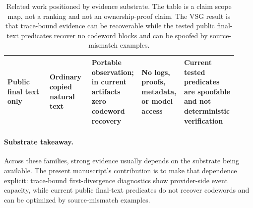 \begin{table}[t]
\begin{tabular}{p{0.18\linewidth}p{0.18\linewidth}p{0.19\linewidth}p{0.18\linewidth}p{0.19\linewidth}}
Public final text only & Ordinary copied natural text & Portable observation; in current artifacts zero codeword recovery & No logs, proofs, metadata, or model access & Current tested predicates are spoofable and not deterministic verification \\
\bottomrule
\end{tabular}
\caption{Related work positioned by evidence substrate.  The table is a claim
scope map, not a ranking and not an ownership-proof claim.  The VSG result is
that trace-bound evidence can be recoverable while the tested public final-text
predicates recover no codeword blocks and can be spoofed by source-mismatch
examples.}
\label{tab:extended-substrate-positioning}
\end{table}

\paragraph{Substrate takeaway.}
Across these families, strong evidence usually depends on the substrate being
available.  The present manuscript's contribution is to make that dependence
explicit: trace-bound first-divergence diagnostics show provider-side event
capacity, while current public final-text predicates do not recover codewords
and can be optimized by source-mismatch examples.
